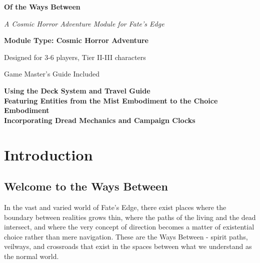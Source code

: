 \documentclass[11pt]{article}
\begin{document}
\begin{titlepage}
\centering
\vspace*{2cm}

{\Huge\bfseries\color{headercolor} Of the Ways Between} 

\vspace{0.5cm}

{\Large\itshape A Cosmic Horror Adventure Module for Fate's Edge}

\vspace{2cm}

\vspace{2cm}

{\Large\bfseries Module Type: Cosmic Horror Adventure}

\vspace{1cm}

{\large Designed for 3-6 players, Tier II-III characters}

\vspace{1cm}

{\large Game Master's Guide Included}

\vfill

{\large 
\textbf{Using the Deck System and Travel Guide} \\
\textbf{Featuring Entities from the Mist Embodiment to the Choice Embodiment} \\
\textbf{Incorporating Dread Mechanics and Campaign Clocks}
}

\end{titlepage}

\newpage

\tableofcontents

\newpage

\section{Introduction}

\subsection{Welcome to the Ways Between}

In the vast and varied world of Fate's Edge, there exist places where the boundary between realities grows thin, where the paths of the living and the dead intersect, and where the very concept of direction becomes a matter of existential choice rather than mere navigation. These are the Ways Between - spirit paths, veilways, and crossroads that exist in the spaces between what we understand as the normal world.
\end{document}
